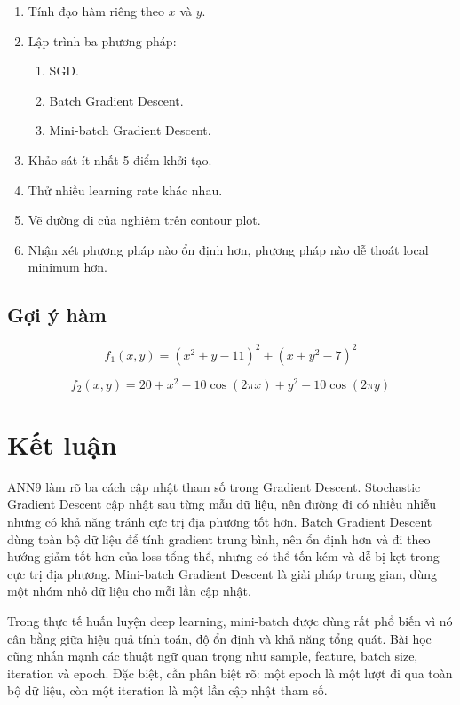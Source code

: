 \documentclass[12pt,a4paper]{report}
\begin{document}
\begin{enumerate}
    \item Tính đạo hàm riêng theo $x$ và $y$.
    \item Lập trình ba phương pháp:
    \begin{enumerate}
        \item SGD.
        \item Batch Gradient Descent.
        \item Mini-batch Gradient Descent.
    \end{enumerate}
    \item Khảo sát ít nhất 5 điểm khởi tạo.
    \item Thử nhiều learning rate khác nhau.
    \item Vẽ đường đi của nghiệm trên contour plot.
    \item Nhận xét phương pháp nào ổn định hơn, phương pháp nào dễ thoát local minimum hơn.
\end{enumerate}

\section*{Gợi ý hàm}

\[
    f_1(x,y)
    =
    (x^2+y-11)^2
    +
    (x+y^2-7)^2
\]

\[
    f_2(x,y)
    =
    20
    +
    x^2
    -
    10\cos(2\pi x)
    +
    y^2
    -
    10\cos(2\pi y)
\]

\chapter*{Kết luận}

ANN9 làm rõ ba cách cập nhật tham số trong Gradient Descent. Stochastic Gradient Descent cập nhật sau từng mẫu dữ liệu, nên đường đi có nhiều nhiễu nhưng có khả năng tránh cực trị địa phương tốt hơn. Batch Gradient Descent dùng toàn bộ dữ liệu để tính gradient trung bình, nên ổn định hơn và đi theo hướng giảm tốt hơn của loss tổng thể, nhưng có thể tốn kém và dễ bị kẹt trong cực trị địa phương. Mini-batch Gradient Descent là giải pháp trung gian, dùng một nhóm nhỏ dữ liệu cho mỗi lần cập nhật.

Trong thực tế huấn luyện deep learning, mini-batch được dùng rất phổ biến vì nó cân bằng giữa hiệu quả tính toán, độ ổn định và khả năng tổng quát. Bài học cũng nhấn mạnh các thuật ngữ quan trọng như sample, feature, batch size, iteration và epoch. Đặc biệt, cần phân biệt rõ: một epoch là một lượt đi qua toàn bộ dữ liệu, còn một iteration là một lần cập nhật tham số.
\end{document}
